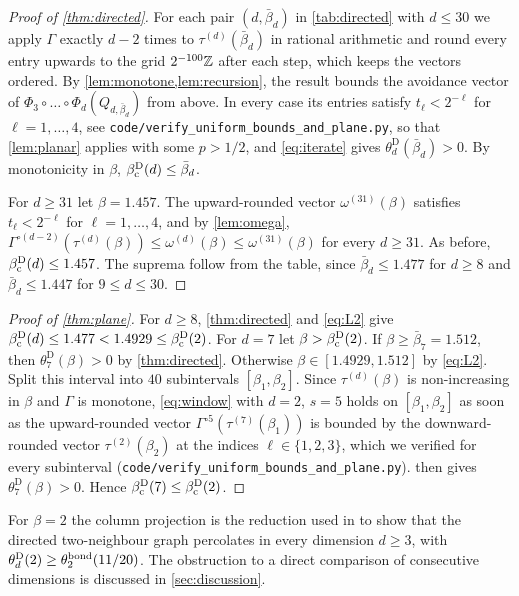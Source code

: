\documentclass[11pt,letterpaper]{article}
\begin{document}
\begin{proof}[Proof of \cref{thm:directed}]
For each pair $(d,\bar\beta_d)$ in \cref{tab:directed} with $d\le30$ we apply $\Gamma$ exactly $d-2$ times to $\tau^{(d)}(\bar\beta_d)$ in rational arithmetic and round every entry upwards to the grid $2^{-100}\mathbb Z$ after each step, which keeps the vectors ordered. By \cref{lem:monotone,lem:recursion}, the result bounds the avoidance vector of $\Phi_3\circ\dots\circ\Phi_d(Q_{d,\bar\beta_d})$ from above. In every case its entries satisfy $t_\ell<2^{-\ell}$ for $\ell=1,\dots,4$, see \texttt{code/verify\_uniform\_bounds\_and\_plane.py}, so that \cref{lem:planar} applies with some $p>1/2$, and \eqref{eq:iterate} gives $\theta^{\mathrm D}_d(\bar\beta_d)>0$. By monotonicity in $\beta$, $\beta_{\mathrm c}^{\mathrm D}(d)\le\bar\beta_d$.

For $d\ge31$ let $\beta=1.457$. The upward-rounded vector $\omega^{(31)}(\beta)$ satisfies $t_\ell<2^{-\ell}$ for $\ell=1,\dots,4$, and by \cref{lem:omega}, $\Gamma^{\circ(d-2)}(\tau^{(d)}(\beta))\le\omega^{(d)}(\beta)\le\omega^{(31)}(\beta)$ for every $d\ge31$. As before, $\beta_{\mathrm c}^{\mathrm D}(d)\le1.457$. The suprema follow from the table, since $\bar\beta_d\le1.477$ for $d\ge8$ and $\bar\beta_d\le1.447$ for $9\le d\le30$.
\end{proof}

\begin{proof}[Proof of \cref{thm:plane}]
For $d\ge8$, \cref{thm:directed} and \eqref{eq:L2} give $\beta_{\mathrm c}^{\mathrm D}(d)\le1.477<1.4929\le\beta_{\mathrm c}^{\mathrm D}(2)$. For $d=7$ let $\beta>\beta_{\mathrm c}^{\mathrm D}(2)$. If $\beta\ge\bar\beta_7=1.512$, then $\theta^{\mathrm D}_7(\beta)>0$ by \cref{thm:directed}. Otherwise $\beta\in[1.4929,1.512]$ by \eqref{eq:L2}. Split this interval into $40$ subintervals $[\beta_1,\beta_2]$. Since $\tau^{(d)}(\beta)$ is non-increasing in $\beta$ and $\Gamma$ is monotone, \eqref{eq:window} with $d=2$, $s=5$ holds on $[\beta_1,\beta_2]$ as soon as the upward-rounded vector $\Gamma^{\circ5}(\tau^{(7)}(\beta_1))$ is bounded by the downward-rounded vector $\tau^{(2)}(\beta_2)$ at the indices $\ell\in\{1,2,3\}$, which we verified for every subinterval (\texttt{code/verify\_uniform\_bounds\_and\_plane.py}).  then gives $\theta^{\mathrm D}_7(\beta)>0$. Hence $\beta_{\mathrm c}^{\mathrm D}(7)\le\beta_{\mathrm c}^{\mathrm D}(2)$.
\end{proof}

\begin{remark}\label{rem:column}
For $\beta=2$ the column projection is the reduction used in \cite{LXZ26} to show that the directed two-neighbour graph percolates in every dimension $d\ge3$, with $\theta^{\mathrm D}_d(2)\ge\theta^{\mathrm{bond}}_2(11/20)$. The obstruction to a direct comparison of consecutive dimensions is discussed in \cref{sec:discussion}.
\end{remark}
\end{document}
